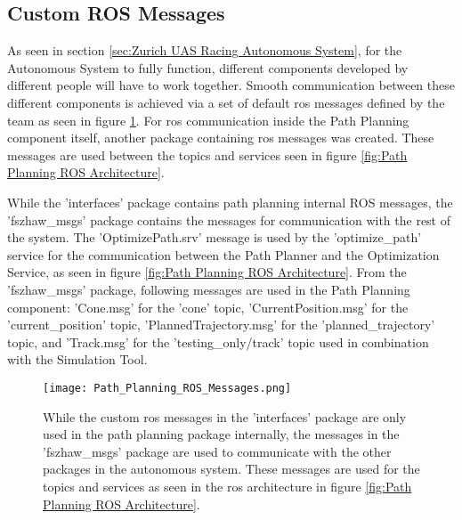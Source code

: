 \subsection{Custom ROS Messages} \label{sec:Custom ROS Messages}
As seen in section \ref{sec:Zurich UAS Racing Autonomous System}, for the Autonomous System to fully function, different components developed by different people will have to work together. Smooth communication between these different components is achieved via a set of default \acrshort{ros} messages defined by the team as seen in figure \ref{fig:Path Planning ROS Messages}. For \acrshort{ros} communication inside the Path Planning component itself, another package containing \acrshort{ros} messages was created. These messages are used between the topics and services seen in figure \ref{fig:Path Planning ROS Architecture}.

While the 'interfaces' package contains path planning internal ROS messages, the 'fszhaw\_msgs' package contains the messages for communication with the rest of the system. The 'OptimizePath.srv' message is used by the 'optimize\_path' service for the communication between the Path Planner and the Optimization Service, as seen in figure \ref{fig:Path Planning ROS Architecture}. From the 'fszhaw\_msgs' package, following messages are used in the Path Planning component: 'Cone.msg' for the 'cone' topic, 'CurrentPosition.msg' for the 'current\_position' topic, 'PlannedTrajectory.msg' for the 'planned\_trajectory' topic, and 'Track.msg' for the 'testing\_only/track' topic used in combination with the Simulation Tool.

\begin{figure}[H]
    \centering
    \texttt{[image: Path\_Planning\_ROS\_Messages.png]}
    \caption{While the custom \acrshort{ros} messages in the 'interfaces' package are only used in the path planning package internally, the messages in the 'fszhaw\_msgs' package are used to communicate with the other packages in the autonomous system. These messages are used for the topics and services as seen in the \acrshort{ros} architecture in figure \ref{fig:Path Planning ROS Architecture}.}
    \label{fig:Path Planning ROS Messages}
\end{figure}

